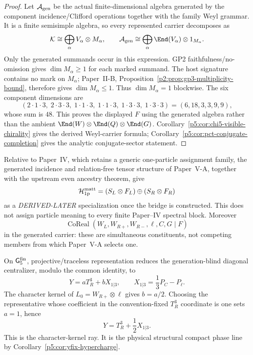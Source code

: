 \documentclass[12pt,a4paper]{article}
\begin{document}
\begin{proof}
Let \(\mathcal A_{\rm gen}\) be the actual finite-dimensional algebra
generated by the component incidence/Clifford operations together with the
family Weyl grammar.  It is a finite semisimple algebra, so every represented
carrier decomposes as
\[
\mathcal K\cong
\bigoplus_{\alpha}V_\alpha\otimes M_\alpha,
\qquad
\mathcal A_{\rm gen}\cong
\bigoplus_{\alpha}\End(V_\alpha)\otimes1_{M_\alpha}.
\]
Only the generated summands occur in this expression.  GP2
faithfulness/no-omission gives \(\dim M_\alpha\ge1\) for each marked
summand.  The host signature contains no mark on \(M_\alpha\); Paper~II-B,
Proposition~\ref{p2:prop:gp3-multiplicity-bound}, therefore gives
\(\dim M_\alpha\le1\).  Thus \(\dim M_\alpha=1\) blockwise.  The six component
dimensions are
\[
(2\cdot1\cdot3,\;2\cdot3\cdot3,\;
1\cdot1\cdot3,\;1\cdot1\cdot3,\;
1\cdot3\cdot3,\;1\cdot3\cdot3)
=(6,18,3,3,9,9),
\]
whose sum is \(48\).  This proves the displayed \(F\) using the generated
algebra rather than the ambient
\(\End(W)\otimes\End(Q)\otimes\End(G)\).
Corollary~\ref{p5:cor:chi5-visible-chirality} gives the derived Weyl-carrier formula;
Corollary~\ref{p5:cor:pct-conjugate-completion} gives
the analytic conjugate-sector statement.
\end{proof}

\begin{corollary}
\label{p5:cor:one-particle-derived-later}
Relative to Paper~IV, which retains a generic one-particle assignment family,
the generated incidence and relation-free tensor structure of Paper~V-A,
together with the upstream even ancestry theorem, give
\[
\mathcal H_{\rm 1p}^{\rm matt}
=(S_L\otimes F_L)\oplus(S_R\otimes F_R)
\]
as a \emph{DERIVED-LATER} specialization once the bridge is constructed.
This
does not assign particle meaning to every finite Paper--IV spectral block.
Moreover
\[
\operatorname{CoReal}(W_L,W_{R+},W_{R-},\ell,C,G\mid F)
\]
in the generated carrier: these are simultaneous constituents, not competing
members from which Paper~V-A selects one.
\end{corollary}

\begin{lemma}
\label{p5:lem:compact-phase-line-componentwise}
On \(\mathsf G_5^{\rm fin}\), projective/traceless representation reduces the
generation-blind diagonal centralizer, modulo the common identity, to
\begin{equation}
\label{p5:eq:componentwise-abelian-plane}
Y=aT_R^3+bX_{1|3},
\qquad
X_{1|3}=\frac13P_C-P_\ell.
\end{equation}
The character kernel of \(L_0=W_{R+}\otimes\ell\) gives \(b=a/2\).  Choosing the
representative whose coefficient in the convention-fixed \(T_R^3\) coordinate
is one sets \(a=1\), hence
\begin{equation}
\label{p5:eq:componentwise-hypercharge-line}
Y=T_R^3+\frac12X_{1|3}.
\end{equation}
This is the character-kernel ray.  It is the physical structural compact phase line by
Corollary~\ref{p5:cor:yfix-hypercharge}.
\end{lemma}
\end{document}
